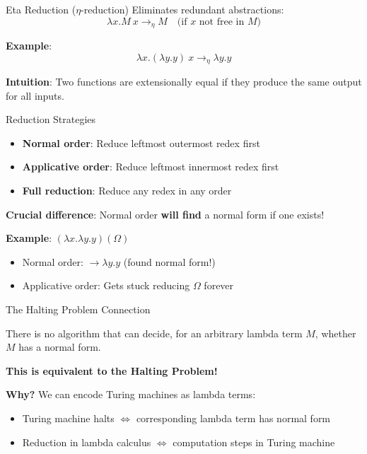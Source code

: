 \documentclass[10pt]{beamer}
\begin{document}
\begin{frame}{Eta Reduction (\(\eta\)-reduction)}
Eliminates redundant abstractions:
\[
\lambda x.M\ x \rightarrow_\eta M \quad \text{(if \(x\) not free in \(M\))}
\]

\vspace{0.3cm}
\textbf{Example}:
\[
\lambda x.(\lambda y.y)\ x \rightarrow_\eta \lambda y.y
\]

\vspace{0.3cm}
\textbf{Intuition}: Two functions are extensionally equal if they produce the same output for all inputs.
\end{frame}

\begin{frame}{Reduction Strategies}
\begin{itemize}
\item \textbf{Normal order}: Reduce leftmost outermost redex first
\item \textbf{Applicative order}: Reduce leftmost innermost redex first
\item \textbf{Full reduction}: Reduce any redex in any order
\end{itemize}

\vspace{0.3cm}
\textbf{Crucial difference}: Normal order \textbf{will find} a normal form if one exists!

\vspace{0.3cm}
\textbf{Example}: \((\lambda x.\lambda y.y)(\Omega)\)
\begin{itemize}
\item Normal order: \(\rightarrow \lambda y.y\) (found normal form!)
\item Applicative order: Gets stuck reducing \(\Omega\) forever
\end{itemize}
\end{frame}

\begin{frame}{The Halting Problem Connection}
\begin{theorem}
There is no algorithm that can decide, for an arbitrary lambda term \(M\), whether \(M\) has a normal form.
\end{theorem}

\vspace{0.3cm}
\textbf{This is equivalent to the Halting Problem!}

\vspace{0.3cm}
\textbf{Why?} We can encode Turing machines as lambda terms:
\begin{itemize}
\item Turing machine halts \(\Leftrightarrow\) corresponding lambda term has normal form
\item Reduction in lambda calculus \(\Leftrightarrow\) computation steps in Turing machine
\end{itemize}
\end{frame}
\end{document}
